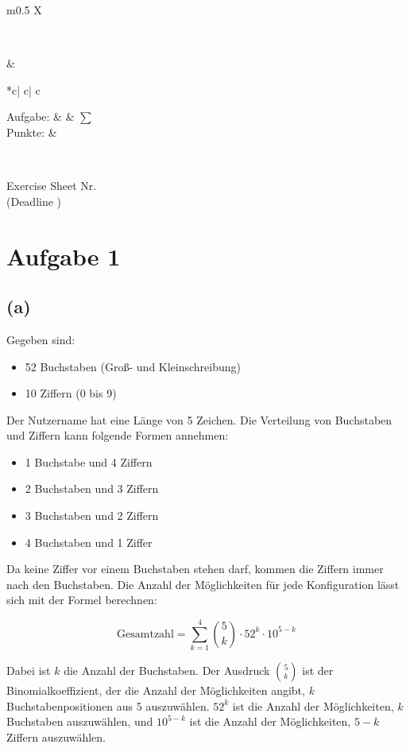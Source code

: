 \documentclass[a4paper]{scrartcl}
\newcounter{aufgabe}
\newcommand{\punkteliste}[2]{%

  \begin{center}%
  \begin{tabular}{*{#2}{c|} c| c}

  Aufgabe: & 
  \forloop{aufgabe}{0}{\value{aufgabe} < #2}%
  {
    \fpeval{\value{aufgabe}+#1} &
  }   $\sum $\\
 \hline
 Punkte:
 \forloop{aufgabe}{-1}{\value{aufgabe} < #2}%
  {
    &
  } 
  \end{tabular}
  \end{center}
}
\def\header#1#2{
  \begin{center}
    {\Large Exercise Sheet #1}\\
    {(Deadline #2)}
  \end{center}
}
\begin{document}
\begin{tabularx}{\linewidth}{m{0.5 \linewidth} X}
    \begin{minipage}{\linewidth}
      \STUDENTA\\
    \end{minipage} & 
    \begin{minipage}{\linewidth}
      \punkteliste{\AUFGABENSTART}{\EXERCISES}
    \end{minipage}\\
  \end{tabularx}
  \setcounter{aufgabe}{\AUFGABENSTART}%
  \header{Nr. \NUMBER}{\DEADLINE}

\section*{Aufgabe 1}
\subsection*{(a)}
Gegeben sind:
\begin{itemize}
    \item 52 Buchstaben (Groß- und Kleinschreibung)
    \item 10 Ziffern (0 bis 9)
\end{itemize}

Der Nutzername hat eine Länge von 5 Zeichen. Die Verteilung von Buchstaben und Ziffern kann folgende Formen annehmen:
\begin{itemize}
    \item 1 Buchstabe und 4 Ziffern
    \item 2 Buchstaben und 3 Ziffern
    \item 3 Buchstaben und 2 Ziffern
    \item 4 Buchstaben und 1 Ziffer
\end{itemize}

Da keine Ziffer vor einem Buchstaben stehen darf, kommen die Ziffern immer nach den Buchstaben. Die Anzahl der Möglichkeiten für jede Konfiguration lässt sich mit der Formel berechnen:

\[
\text{Gesamtzahl} = \sum_{k=1}^{4} \binom{5}{k} \cdot 52^k \cdot 10^{5-k}
\]

Dabei ist \( k \) die Anzahl der Buchstaben. Der Ausdruck \( \binom{5}{k} \) ist der Binomialkoeffizient, der die Anzahl der Möglichkeiten angibt, \( k \) Buchstabenpositionen aus 5 auszuwählen. \( 52^k \) ist die Anzahl der Möglichkeiten, \( k \) Buchstaben auszuwählen, und \( 10^{5-k} \) ist die Anzahl der Möglichkeiten, \( 5-k \) Ziffern auszuwählen.
\end{document}
